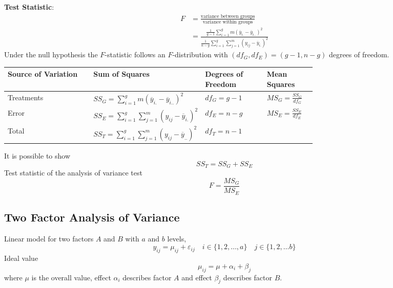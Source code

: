 \documentclass[11pt]{article}
\theoremstyle{definition}
\newcommand*\samplemean[1]{\overline{#1}}
\begin{document}
\vspace*{1em}
\noindent
\textbf{Test Statistic}:
\begin{align*}
	F &= \frac{\text{variance between groups}}{\text{variance within groups}}\\
	&= \frac{\frac{1}{g-1}\sum_{i=1}^{g}m\left(\samplemean{y}_{i.} - \samplemean{y}_{i..}\right)^2}{\frac{1}{n-g}\sum_{i=1}^{g}\sum_{j=1}^{m}\left(y_{ij} - \samplemean{y}_{i.}\right)^2}
\end{align*}
Under the null hypothesis the $F$-statistic follows an $F$-distribution with $(df_G ,df_E ) = (g - 1,n - g)$ degrees of freedom.
\begingroup
\renewcommand{\arraystretch}{1.8}
\begin{tabularx}{\linewidth}{X | p{0.34\linewidth} p{0.2\linewidth} p{0.16\linewidth}}
	Source of Variation & Sum of Squares & Degrees of Freedom & Mean Squares\\
	\hline
	Treatments & $SS_G = \sum_{i=1}^{g}m\left(\samplemean{y}_{i.} - \samplemean{y}_{i..}\right)^2$ & $df_G = g-1$ & $MS_G = \frac{SS_G}{df_G}$\\
	Error & $SS_E = \sum_{i=1}^{g}\sum_{j=1}^{m}\left(y_{ij} - \samplemean{y}_{i.}\right)^2$ & $df_E = n-g$ & $MS_E = \frac{SS_E}{df_E}$\\
	\hline
	Total & $SS_T = \sum_{i=1}^{g}\sum_{j=1}^{m}\left(y_{ij}-\samplemean{y}_{..}\right)^2$ & $df_T = n-1$ & 
\end{tabularx}
\endgroup
\noindent
It is possible to show
\begin{equation*}
	SS_T = SS_G + SS_E
\end{equation*}
Test statistic of the analysis of variance test
\begin{equation*}
	F = \frac{MS_G}{MS_E}
\end{equation*}

\subsection{Two Factor Analysis of Variance}
Linear model for two factors $A$ and $B$ with $a$ and $b$ levels,
\begin{equation*}
	y_{ij} = \mu_{ij} + \varepsilon_{ij}\quad i\in\{1,2,\dots,a\}\quad j\in\{1,2,\dots b\}
\end{equation*}
Ideal value
\begin{equation*}
	\mu_{ij} = \mu + \alpha_i + \beta_j
\end{equation*}
where $\mu$ is the overall value, effect $\alpha_i$ describes factor $A$ and effect $\beta_j$ describes factor $B$.
\end{document}
